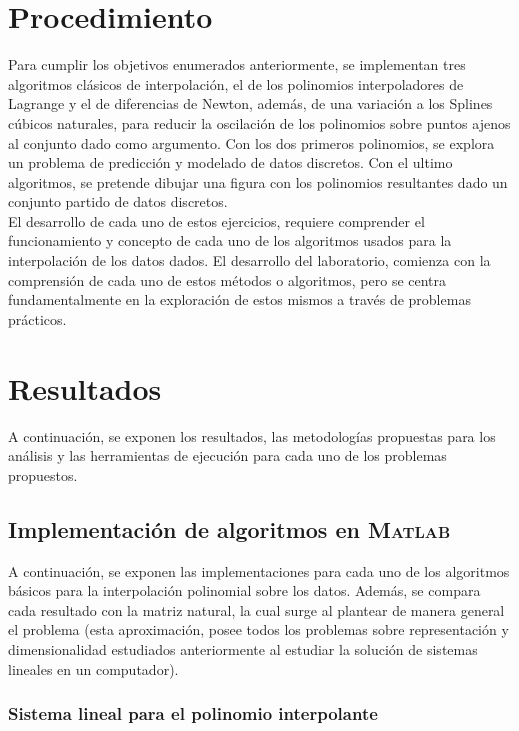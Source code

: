 \documentclass[11pt, spanish]{article}
\begin{document}
\section{Procedimiento}

Para cumplir los objetivos enumerados anteriormente, se implementan tres algoritmos clásicos de interpolación, el de los polinomios interpoladores de Lagrange y el de diferencias de Newton, además, de una variación a los Splines cúbicos naturales, para reducir la oscilación de los polinomios sobre puntos ajenos al conjunto dado como argumento. Con los dos primeros polinomios, se explora un problema de predicción y modelado de datos discretos. Con el ultimo algoritmos, se pretende dibujar una figura con los polinomios resultantes dado un conjunto partido de datos discretos.\\

 El desarrollo de cada uno de estos ejercicios, requiere comprender el funcionamiento y concepto de cada uno de los algoritmos usados para la interpolación de los datos dados. El desarrollo del laboratorio, comienza con la comprensión de cada uno de estos métodos o algoritmos, pero se centra fundamentalmente en la exploración de estos mismos a través de problemas prácticos.

\section{Resultados}

A continuación, se exponen los resultados, las metodologías propuestas para los análisis y las herramientas de ejecución para cada uno de los problemas propuestos.

\subsection{Implementación de algoritmos en \textsc{Matlab}}

A continuación, se exponen las implementaciones para cada uno de los algoritmos básicos para la interpolación polinomial sobre los datos. Además, se compara cada resultado con la matriz natural, la cual surge al plantear de manera general el problema (esta aproximación, posee todos los problemas sobre representación y dimensionalidad estudiados anteriormente al estudiar la solución de sistemas lineales en un computador).

\subsubsection{Sistema lineal para el polinomio interpolante}
\end{document}
